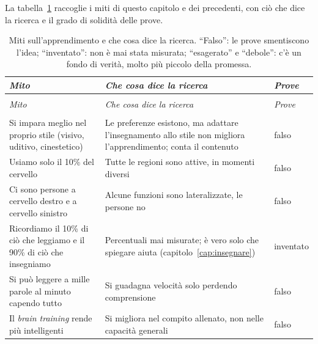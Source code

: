 La tabella~\ref{tab:miti} raccoglie i miti di questo capitolo e dei
precedenti, con ciò che dice la ricerca e il grado di solidità delle
prove.

\begingroup\small
\setlength{\LTpre}{1.2\baselineskip}\setlength{\LTpost}{1.2\baselineskip}
\begin{longtable}{@{}>{\raggedright\arraybackslash}p{}>{\raggedright\arraybackslash}p{}>{\raggedright\arraybackslash}p{}@{}}
  \caption{Miti sull'apprendimento e che cosa dice la ricerca.
    \enquote{Falso}: le prove smentiscono l'idea; \enquote{inventato}:
    non è mai stata misurata; \enquote{esagerato} e \enquote{debole}:
    c'è un fondo di verità, molto più piccolo della promessa.}
  \label{tab:miti} \\
    \toprule
    \textit{Mito} & \textit{Che cosa dice la ricerca} & \textit{Prove} \\
    \midrule
    \endfirsthead
    \multicolumn{3}{@{}l}{\small\emph{Tabella~\thetable{} (continua)}} \\
    \toprule
    \textit{Mito} & \textit{Che cosa dice la ricerca} & \textit{Prove} \\
    \midrule
    \endhead
    \midrule
    \multicolumn{3}{r@{}}{\small\emph{segue}} \\
    \endfoot
    \bottomrule
    \endlastfoot
    Si impara meglio nel proprio stile (visivo, uditivo, cinestetico)
      & Le preferenze esistono, ma adattare l'insegnamento allo stile
        non migliora l'apprendimento; conta il contenuto
      & falso \\
    \addlinespace
    Usiamo solo il 10\% del cervello
      & Tutte le regioni sono attive, in momenti diversi
      & falso \\
    \addlinespace
    Ci sono persone a cervello destro e a cervello sinistro
      & Alcune funzioni sono lateralizzate, le persone no
      & falso \\
    \addlinespace
    Ricordiamo il 10\% di ciò che leggiamo e il 90\% di ciò che
      insegniamo
      & Percentuali mai misurate; è vero solo che spiegare aiuta
        (capitolo~\ref{cap:insegnare})
      & inventato \\
    \addlinespace
    Si può leggere a mille parole al minuto capendo tutto
      & Si guadagna velocità solo perdendo comprensione
      & falso \\
    \addlinespace
    Il \emph{brain training} rende più intelligenti
      & Si migliora nel compito allenato, non nelle capacità generali
      & falso \\

\end{longtable}
